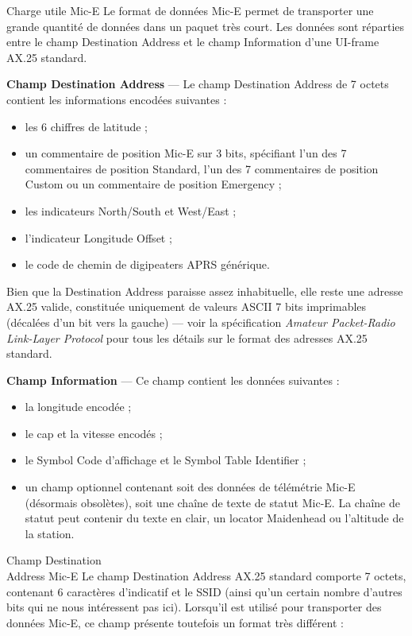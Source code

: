 \begin{aprssideblock}{Charge utile Mic-E}
Le format de données Mic-E permet de transporter une grande quantité de
données dans un paquet très court. Les données sont réparties entre le champ
Destination Address et le champ Information d'une UI-frame AX.25 standard.

\textbf{Champ Destination Address} --- Le champ Destination Address de
7 octets contient les informations encodées suivantes :

\begin{itemize}\chTenItems
\item les 6 chiffres de latitude ;
\item un commentaire de position Mic-E sur 3 bits, spécifiant l'un des
  7 commentaires de position Standard, l'un des 7 commentaires de position
  Custom ou un commentaire de position Emergency ;
\item les indicateurs North/South et West/East ;
\item l'indicateur Longitude Offset ;
\item le code de chemin de digipeaters APRS générique.
\end{itemize}

Bien que la Destination Address paraisse assez inhabituelle, elle reste une
adresse AX.25 valide, constituée uniquement de valeurs ASCII 7 bits imprimables
(décalées d'un bit vers la gauche) --- voir la spécification
\textit{Amateur Packet-Radio Link-Layer Protocol} pour tous les détails sur le
format des adresses AX.25 standard.

\textbf{Champ Information} --- Ce champ contient les données suivantes :

\begin{itemize}\chTenItems
\item la longitude encodée ;
\item le cap et la vitesse encodés ;
\item le Symbol Code d'affichage et le Symbol Table Identifier ;
\item un champ optionnel contenant soit des données de télémétrie Mic-E
  (désormais obsolètes), soit une chaîne de texte de statut Mic-E. La chaîne de
  statut peut contenir du texte en clair, un locator Maidenhead ou l'altitude
  de la station.
\end{itemize}
\end{aprssideblock}

\begin{aprssideblock}{Champ Destination\\Address Mic-E}
Le champ Destination Address AX.25 standard comporte 7 octets, contenant
6 caractères d'indicatif et le SSID (ainsi qu'un certain nombre d'autres bits
qui ne nous intéressent pas ici). Lorsqu'il est utilisé pour transporter des
données Mic-E, ce champ présente toutefois un format très différent :
\end{aprssideblock}

